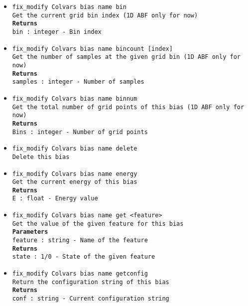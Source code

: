 \begin{itemize}
\item \texttt{fix\_modify Colvars bias name bin}
\\
\texttt{Get the current grid bin index (1D ABF only for now)}
\\
\texttt{\textbf{Returns}}
\\
\texttt{bin : integer - Bin index}
\item \texttt{fix\_modify Colvars bias name bincount [index]}
\\
\texttt{Get the number of samples at the given grid bin (1D ABF only for now)}
\\
\texttt{\textbf{Returns}}
\\
\texttt{samples : integer - Number of samples}
\item \texttt{fix\_modify Colvars bias name binnum}
\\
\texttt{Get the total number of grid points of this bias (1D ABF only for now)}
\\
\texttt{\textbf{Returns}}
\\
\texttt{Bins : integer - Number of grid points}
\item \texttt{fix\_modify Colvars bias name delete}
\\
\texttt{Delete this bias}
\item \texttt{fix\_modify Colvars bias name energy}
\\
\texttt{Get the current energy of this bias}
\\
\texttt{\textbf{Returns}}
\\
\texttt{E : float - Energy value}
\item \texttt{fix\_modify Colvars bias name get <feature>}
\\
\texttt{Get the value of the given feature for this bias}
\\
\texttt{\textbf{Parameters}}
\\
\texttt{feature : string - Name of the feature}
\\
\texttt{\textbf{Returns}}
\\
\texttt{state : 1/0 - State of the given feature}
\item \texttt{fix\_modify Colvars bias name getconfig}
\\
\texttt{Return the configuration string of this bias}
\\
\texttt{\textbf{Returns}}
\\
\texttt{conf : string - Current configuration string}

\end{itemize}

